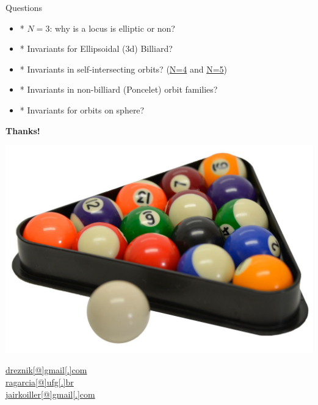 \begin{frame}{Questions}
\begin{itemize}
    \item * $N=3$: why is a locus is elliptic or non?
    \item * Invariants for Ellipsoidal (3d) Billiard?
    \item * Invariants in self-intersecting orbits? (\href{https://youtu.be/cCYxN7ueGV4}{N=4} and \href{https://youtu.be/ECe4DptduJY}{N=5})
    \item * Invariants in non-billiard (Poncelet) orbit families?
    \item * Invariants for orbits on sphere?
\end{itemize}

\vspace*{1cm}

\begin{minipage}{.2\textwidth}
\textbf{Thanks!}
\end{minipage}
\begin{minipage}{.3\textwidth}
\includegraphics[height=0.25\textheight]{pics/0000_billiard_rack.png} 
\end{minipage}
\begin{minipage}{.4\textwidth}
\href{dreznik@gmail.com}{dreznik[@]gmail[.]com}\\
\href{ragarcia@ufg.br}{ragarcia[@]ufg[.]br}\\
\href{jairkoiller@gmail.com}{jairkoiller[@]gmail[.]com}
\end{minipage}
\end{frame}

